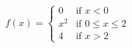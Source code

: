 \documentclass[preview]{standalone}
\begin{document}
\begin{align*}
{f(x) = \begin{cases} 0 & \text{if } x < 0 \\ x^2 & \text{if } 0 \leq x \leq 2 \\ 4 & \text{if } x > 2 \end{cases}}
\end{align*}
\end{document}
